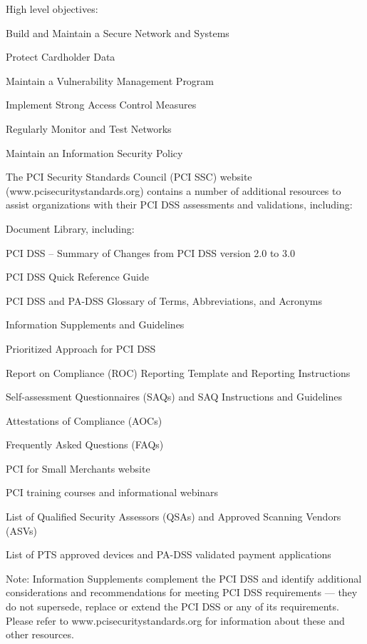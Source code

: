 \documentclass[Screen16to9,17pt]{foils}
\begin{document}

\begin{list1}
\item High level objectives:
\begin{list2}
\item Build and Maintain a Secure Network and Systems
\item Protect Cardholder Data
\item Maintain a Vulnerability Management Program
\item Implement Strong Access Control Measures
\item Regularly Monitor and Test Networks
\item Maintain an Information Security Policy
\end{list2}
\end{list1}



The PCI Security Standards Council (PCI SSC) website (www.pcisecuritystandards.org) contains a number of additional resources to assist
organizations with their PCI DSS assessments and validations, including:

\begin{list1}
\item Document Library, including:
\begin{list2}
\item PCI DSS – Summary of Changes from PCI DSS version 2.0 to 3.0
\item PCI DSS Quick Reference Guide
\item PCI DSS and PA-DSS Glossary of Terms, Abbreviations, and Acronyms
\item Information Supplements and Guidelines
\item Prioritized Approach for PCI DSS
\item Report on Compliance (ROC) Reporting Template and Reporting Instructions
\item Self-assessment Questionnaires (SAQs) and SAQ Instructions and Guidelines
\item Attestations of Compliance (AOCs)
\end{list2}

\eject
\item Frequently Asked Questions (FAQs)
\item PCI for Small Merchants website
\item PCI training courses and informational webinars
\item List of Qualified Security Assessors (QSAs) and Approved Scanning Vendors (ASVs)
\item List of PTS approved devices and PA-DSS validated payment applications
\end{list1}
Note: Information Supplements
complement the PCI DSS and identify
additional considerations and
recommendations for meeting PCI DSS
requirements — they do not supersede,
replace or extend the PCI DSS or any of its
requirements.
Please refer to www.pcisecuritystandards.org for information about these and other resources.
\end{document}
